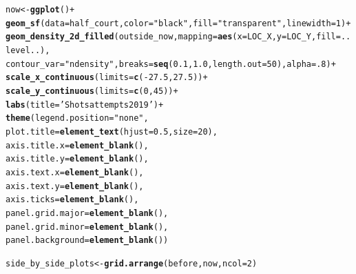 \documentclass{article}\usepackage[]{graphicx}\usepackage[]{xcolor}
\makeatletter
\newcommand{\hlnum}[1]{\textcolor[rgb]{0.686,0.059,0.569}{#1}}%
\newcommand{\hlstr}[1]{\textcolor[rgb]{0.192,0.494,0.8}{#1}}%
\newcommand{\hlopt}[1]{\textcolor[rgb]{0,0,0}{#1}}%
\newcommand{\hlstd}[1]{\textcolor[rgb]{0.345,0.345,0.345}{#1}}%
\newcommand{\hlkwb}[1]{\textcolor[rgb]{0.69,0.353,0.396}{#1}}%
\newcommand{\hlkwc}[1]{\textcolor[rgb]{0.333,0.667,0.333}{#1}}%
\newcommand{\hlkwd}[1]{\textcolor[rgb]{0.737,0.353,0.396}{\textbf{#1}}}%
\newenvironment{kframe}{%
 \def\at@end@of@kframe{}%
 \ifinner\ifhmode%
  \def\at@end@of@kframe{\end{minipage}}%
  \begin{minipage}{\columnwidth}%
 \fi\fi%
 \def\FrameCommand##1{\hskip\@totalleftmargin \hskip-\fboxsep
 \colorbox{shadecolor}{##1}\hskip-\fboxsep
     \hskip-\linewidth \hskip-\@totalleftmargin \hskip\columnwidth}%
 \MakeFramed {\advance\hsize-\width
   \@totalleftmargin\z@ \linewidth\hsize
   \@setminipage}}%
 {\par\unskip\endMakeFramed%
 \at@end@of@kframe}
\newenvironment{knitrout}{}{} %
\makeatother
\begin{document}
\begin{knitrout}
\begin{kframe}
\begin{alltt}
\hlstd{now} \hlkwb{<-} \hlkwd{ggplot}\hlstd{()} \hlopt{+}
  \hlkwd{geom_sf}\hlstd{(}\hlkwc{data} \hlstd{= half_court,} \hlkwc{color} \hlstd{=} \hlstr{"black"}\hlstd{,} \hlkwc{fill} \hlstd{=} \hlstr{"transparent"}\hlstd{,} \hlkwc{linewidth} \hlstd{=} \hlnum{1}\hlstd{)} \hlopt{+}
  \hlkwd{geom_density_2d_filled}\hlstd{(outside_now,} \hlkwc{mapping} \hlstd{=} \hlkwd{aes}\hlstd{(}\hlkwc{x} \hlstd{= LOC_X,} \hlkwc{y} \hlstd{= LOC_Y,} \hlkwc{fill} \hlstd{= ..level..),}
                         \hlkwc{contour_var} \hlstd{=} \hlstr{"ndensity"}\hlstd{,} \hlkwc{breaks} \hlstd{=} \hlkwd{seq}\hlstd{(}\hlnum{0.1}\hlstd{,} \hlnum{1.0}\hlstd{,} \hlkwc{length.out} \hlstd{=} \hlnum{50}\hlstd{),} \hlkwc{alpha} \hlstd{=} \hlnum{.8}\hlstd{)} \hlopt{+}
  \hlkwd{scale_x_continuous}\hlstd{(}\hlkwc{limits} \hlstd{=} \hlkwd{c}\hlstd{(}\hlopt{-}\hlnum{27.5}\hlstd{,} \hlnum{27.5}\hlstd{))} \hlopt{+}
  \hlkwd{scale_y_continuous}\hlstd{(}\hlkwc{limits} \hlstd{=} \hlkwd{c}\hlstd{(}\hlnum{0}\hlstd{,} \hlnum{45}\hlstd{))} \hlopt{+}
  \hlkwd{labs}\hlstd{(}\hlkwc{title} \hlstd{=} \hlstr{'Shots attempts 2019'}\hlstd{)} \hlopt{+}
  \hlkwd{theme}\hlstd{(}\hlkwc{legend.position} \hlstd{=} \hlstr{"none"}\hlstd{,}
        \hlkwc{plot.title} \hlstd{=} \hlkwd{element_text}\hlstd{(}\hlkwc{hjust} \hlstd{=} \hlnum{0.5}\hlstd{,} \hlkwc{size} \hlstd{=} \hlnum{20}\hlstd{),}
        \hlkwc{axis.title.x} \hlstd{=} \hlkwd{element_blank}\hlstd{(),}
        \hlkwc{axis.title.y} \hlstd{=} \hlkwd{element_blank}\hlstd{(),}
        \hlkwc{axis.text.x} \hlstd{=} \hlkwd{element_blank}\hlstd{(),}
        \hlkwc{axis.text.y} \hlstd{=} \hlkwd{element_blank}\hlstd{(),}
        \hlkwc{axis.ticks} \hlstd{=} \hlkwd{element_blank}\hlstd{(),}
        \hlkwc{panel.grid.major} \hlstd{=} \hlkwd{element_blank}\hlstd{(),}
        \hlkwc{panel.grid.minor} \hlstd{=} \hlkwd{element_blank}\hlstd{(),}
        \hlkwc{panel.background} \hlstd{=} \hlkwd{element_blank}\hlstd{())}

\hlstd{side_by_side_plots} \hlkwb{<-} \hlkwd{grid.arrange}\hlstd{(before, now,} \hlkwc{ncol} \hlstd{=} \hlnum{2}\hlstd{)}
\end{alltt}


{\ttfamily\noindent\color{warningcolor}{\#\# Warning: Removed 445 rows containing non-finite outside the scale range\\\#\# (`stat\_density2d\_filled()`).}}\end{kframe}


\end{knitrout}
\end{document}
